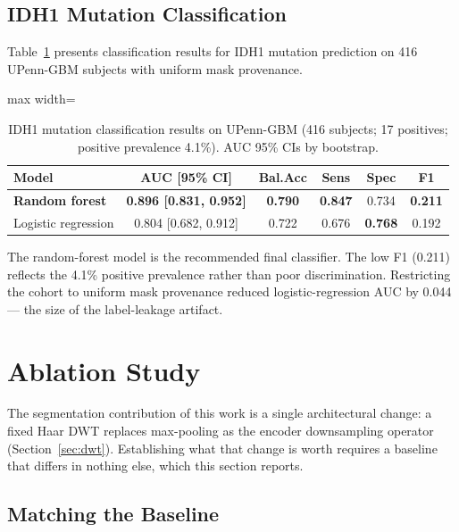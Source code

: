 \documentclass[conference]{IEEEtran}
\begin{document}
\subsection{IDH1 Mutation Classification}

Table~\ref{tab:idh1} presents classification results for IDH1 mutation prediction on 416 UPenn-GBM subjects with uniform mask provenance.

\begin{table}[!t]
\centering
\caption{IDH1 mutation classification results on UPenn-GBM (416 subjects; 17 positives; positive prevalence 4.1\%). AUC 95\% CIs by bootstrap.}
\label{tab:idh1}
\begin{adjustbox}{max width=\columnwidth}
\begin{tabular}{lccccc}
\toprule
\textbf{Model} & \textbf{AUC [95\% CI]} & \textbf{Bal.Acc} & \textbf{Sens} & \textbf{Spec} & \textbf{F1} \\
\midrule
\textbf{Random forest} & \textbf{0.896 [0.831, 0.952]} & \textbf{0.790} & \textbf{0.847} & 0.734 & \textbf{0.211} \\
Logistic regression & 0.804 [0.682, 0.912] & 0.722 & 0.676 & \textbf{0.768} & 0.192 \\
\bottomrule
\end{tabular}
\end{adjustbox}
\end{table}

The random-forest model is the recommended final classifier. The low F1 (0.211) reflects the 4.1\% positive prevalence rather than poor discrimination. Restricting the cohort to uniform mask provenance reduced logistic-regression AUC by 0.044 --- the size of the label-leakage artifact.

\section{Ablation Study}
\label{sec:ablation}

The segmentation contribution of this work is a single architectural change: a fixed Haar DWT replaces max-pooling as the encoder downsampling operator (Section~\ref{sec:dwt}). Establishing what that change is worth requires a baseline that differs in nothing else, which this section reports.

\subsection{Matching the Baseline}
\end{document}
